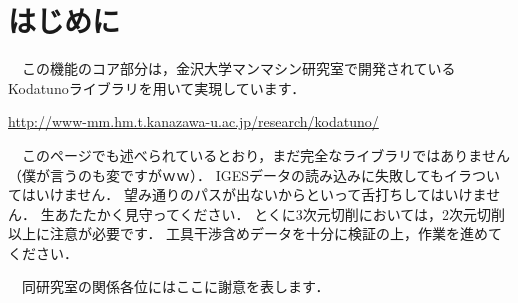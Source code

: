 \section*{はじめに}
　この機能のコア部分は，金沢大学マンマシン研究室で開発されているKodatunoライブラリを用いて実現しています．
\begin{center}
\url{http://www-mm.hm.t.kanazawa-u.ac.jp/research/kodatuno/}
\end{center}
　このページでも述べられているとおり，まだ完全なライブラリではありません（僕が言うのも変ですがｗｗ）．
IGESデータの読み込みに失敗してもイラついてはいけません．
望み通りのパスが出ないからといって舌打ちしてはいけません．
生あたたかく見守ってください．
とくに3次元切削においては，2次元切削以上に注意が必要です．
工具干渉含めデータを十分に検証の上，作業を進めてください．

\vspace*{1zh}
　同研究室の関係各位にはここに謝意を表します．
